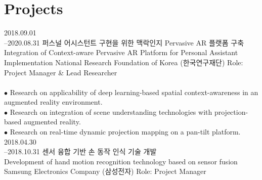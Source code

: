 \documentclass[]{friggeri-cv}
\begin{document}
\section{Projects}

\begin{entrylist}
  \entry
    {2018.09.01\\--2020.08.31} %
    {퍼스널 어시스턴트 구현을 위한 맥락인지 Pervasive AR 플랫폼 구축\\
    Integration of Context-aware Pervasive AR Platform for Personal Assistant Implementation}
    {National Research Foundation of Korea (한국연구재단)}
    {Role: Project Manager \& Lead Researcher\\
    \\
    $\bullet$ Research on applicability of deep learning-based spatial context-awareness in an augmented reality environment.\\
    $\bullet$ Research on integration of  scene understanding technologies with projection-based augmented reality.\\
    $\bullet$ Research on real-time dynamic projection mapping on a pan-tilt platform.
    }
  \entry
    {2018.04.30\\--2018.10.31}
    {센서 융합 기반 손 동작 인식 기술 개발\\
    Development of hand motion recognition technology based on sensor fusion}
    {Samsung Electronics Company (삼성전자)}
    {Role: Project Manager\\
    
}
\end{entrylist}
\end{document}

